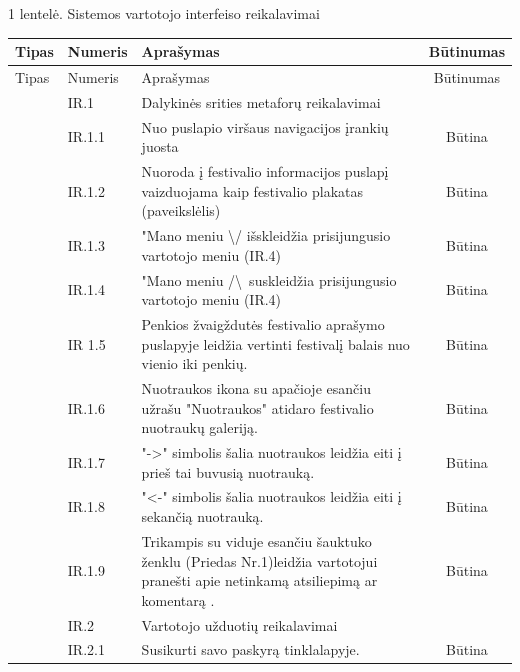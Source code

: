 \documentclass{VUMIFPSkursinis}
\begin{document}
\centerline{1 lentelė. Sistemos vartotojo interfeiso reikalavimai} 
\setlength\tabcolsep{4pt}
\begin{longtable}{|p{1cm}|p{3cm}|p{9cm}|c|}
\hline
Tipas & Numeris & Aprašymas & Būtinumas \\ \hline
\endfirsthead
\hline
Tipas & Numeris & Aprašymas & Būtinumas \\ \hline
\endhead
\hline
\endfoot
\hline
\multirow{84}{*}{\rotatebox{90}{~~~~~~~~~~~~~~~~~~~~~~~~~~~~~~~~~~~~~~~~~~~~~~~~~~~~~~~~~~~~~~~~~~~~~~~~~~~~~~~~~~~~~~~~~~~~~~~~~~~~~~~~~~~~~~~~~~~~~~~~~~~~~~~~~~~~~~~~~~~~~~~~~~~~~~~~~~~~~~~~~~~~~~~~~~~~~~~~~~~~~~~~~~~~~~~~~~~~~~~~~~~~~~~~~~~~~~~~~~~~~~~~~~~~~~~~~~~~~~~~~~~~~~~~~~~~~~~~~~~~~~~~~~~~~~~~~~~~~~~~~~~~~~~~~~Vartotojo interfeiso reikalavimai}} & IR.1 \cellcolor{light-gray}& \multicolumn{2}{l|}{ \cellcolor{light-gray}Dalykinės srities metaforų reikalavimai} \\ \cline{2-4} 
 & IR.1.1 & Nuo puslapio viršaus navigacijos įrankių juosta & Būtina \\ \cline{2-4} 
 & IR.1.2 & Nuoroda į festivalio informacijos puslapį vaizduojama kaip festivalio plakatas (paveikslėlis) & Būtina \\ \cline{2-4} 
 & IR.1.3 & "Mano meniu \textbackslash / išskleidžia prisijungusio vartotojo meniu (IR.4) & Būtina \\ \cline{2-4} 
 & IR.1.4 & "Mano meniu /\textbackslash ~suskleidžia prisijungusio vartotojo meniu (IR.4) & Būtina \\ \cline{2-4} 
 & IR 1.5 & Penkios žvaigždutės festivalio aprašymo puslapyje leidžia vertinti festivalį balais nuo vienio iki penkių. & Būtina \\ \cline{2-4} 
 & IR.1.6 & Nuotraukos ikona su apačioje esančiu užrašu "Nuotraukos" atidaro festivalio nuotraukų galeriją. & Būtina \\ \cline{2-4} 
 & IR.1.7 & "->" simbolis šalia nuotraukos leidžia eiti į prieš tai buvusią nuotrauką. & Būtina \\ \cline{2-4} 
 & IR.1.8 & "<-" simbolis šalia nuotraukos leidžia eiti į sekančią nuotrauką. & Būtina \\ \cline{2-4} 
 & IR.1.9 & Trikampis su viduje esančiu šauktuko ženklu (Priedas Nr.1)leidžia vartotojui pranešti apie netinkamą atsiliepimą ar komentarą . & Būtina \\ \cline{2-4} 
 &  \cellcolor{light-gray}IR.2 & \multicolumn{2}{l|}{ \cellcolor{light-gray}Vartotojo užduotių reikalavimai} \\ \cline{2-4} 
 & IR.2.1 & Susikurti savo paskyrą tinklalapyje. & Būtina \\ \cline{2-4} 

\end{longtable}
\end{document}

